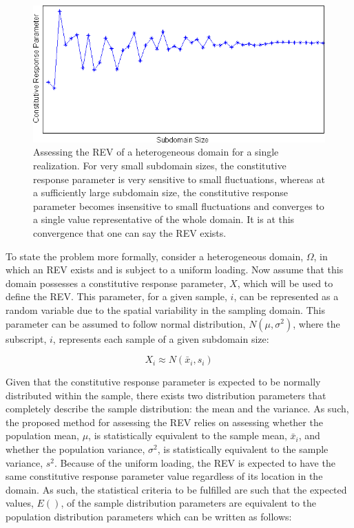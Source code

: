 \begin{figure}[!htb]
\begin{center}
\includegraphics[width=\textwidth]{figures/Chapter3/REVConvergence}
\caption{{\label{fig:revConvergence}Assessing the REV of a heterogeneous domain for a single realization. For very small subdomain sizes, the constitutive response parameter is very sensitive to small fluctuations, whereas at a sufficiently large subdomain size, the constitutive response parameter becomes insensitive to small fluctuations and converges to a single value representative of the whole domain. It is at this convergence that one can say the REV exists.%
}}
\end{center}
\end{figure}

To state the problem more formally, consider a heterogeneous domain, $\Omega$, in which an REV exists and is subject to a uniform loading. Now assume that this domain possesses a constitutive response parameter, $X$, which will be used to define the REV. This parameter, for a given sample, $i$, can be represented as a random variable due to the spatial variability in the sampling domain. This parameter can be assumed to follow normal distribution, $N\left(\mu,\sigma^2 \right)$, where the subscript, $i$, represents each sample of a given subdomain size:

\begin{equation}
X_i \approx N\left(\bar{x}_i,s_i \right)
\label{eqn:rev1}
\end{equation}

Given that the constitutive response parameter is expected to be normally distributed within the sample, there exists two distribution parameters that completely describe the sample distribution: the mean and the variance. As such, the proposed method for assessing the REV relies on assessing whether the population mean, $\mu$, is statistically equivalent to the sample mean, $\bar{x}_i$, and whether the population variance, $\sigma^2$, is statistically equivalent to the sample variance, $s^2$. Because of the uniform loading, the REV is expected to have the same constitutive response parameter value regardless of its location in the domain. As such, the statistical criteria to be fulfilled are such that the expected values, $E()$, of the sample distribution parameters are equivalent to the population distribution parameters which can be written as follows:

